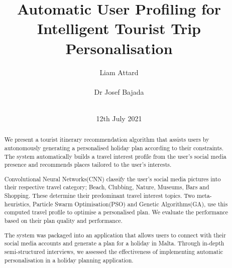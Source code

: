 \documentclass{sig-alternate}
\begin{document}
\title{Automatic User Proﬁling for Intelligent
Tourist Trip Personalisation}
\author{
\alignauthor
Liam Attard\\
       \\
\alignauthor
Dr Josef Bajada\\
       \\
}

\date{12th July 2021}

\makeatletter
\def\@copyrightspace{\relax}
\makeatother

\maketitle
\begin{abstract}

We present a tourist itinerary recommendation algorithm that assists users
by autonomously generating a personalised holiday plan according to their
constraints. The system automatically builds a travel interest profile from
the user's social media presence and recommends places tailored to the
user's interests.

Convolutional Neural Networks(CNN) classify the user's social
media pictures into their respective travel category; Beach, Clubbing,
Nature, Museums, Bars and Shopping. These determine their predominant
travel interest topics. Two meta-heuristics, Particle Swarm Optimisation(PSO)
and Genetic Algorithms(GA), use this computed travel profile to optimise a
personalised plan. We evaluate the performance based on their plan quality
and performance.

The system was packaged into an application that allows users to connect with
their social media accounts and generate a plan for a holiday in Malta. Through
in-depth semi-structured interviews, we assessed the effectiveness of
implementing automatic personalisation in a holiday planning application.

\end{abstract}












\end{document}

